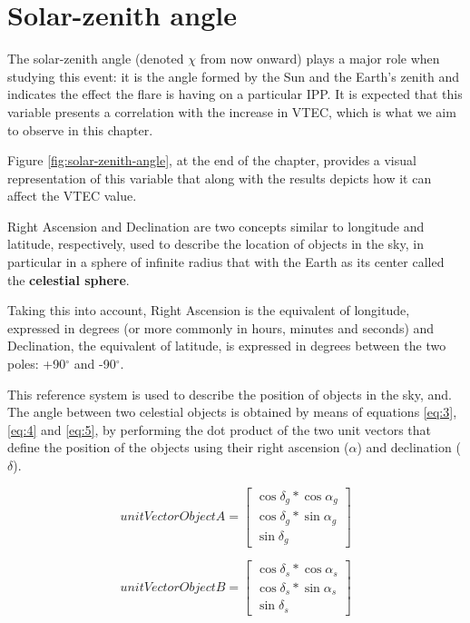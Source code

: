 \section{Solar-zenith angle}

The solar-zenith angle (denoted $\chi$ from now onward) plays a major role when studying this event: it is the angle formed by the Sun and the Earth's zenith and indicates the effect the flare is having on a particular IPP. It is expected that this variable presents a correlation with the increase in VTEC, which is what we aim to observe in this chapter.

Figure \ref{fig:solar-zenith-angle}, at the end of the chapter, provides a visual representation of this variable that along with the results depicts how it can affect the VTEC value. 

Right Ascension and Declination are two concepts similar to longitude and latitude, respectively, used to describe the location of objects in the sky, in particular in a sphere of infinite radius that with the Earth as its center called the \textbf{celestial sphere}.

Taking this into account, Right Ascension is the equivalent of longitude, expressed in degrees (or more commonly in hours, minutes and seconds) and Declination, the equivalent of latitude, is expressed in degrees between the two poles: +90$^{\circ}$ and -90$^{\circ}$. \cite{nasareferencesystem}

This reference system is used to describe the position of objects in the sky, and. The angle between two celestial objects is obtained by means of equations \ref{eq:3}, \ref{eq:4} and \ref{eq:5}, by performing the dot product of the two unit vectors that define the position of the objects using their right ascension ($\alpha$) and declination ($\delta$).

\begin{equation} \label{eq:3}
unitVectorObjectA =	
\begin{bmatrix}
\cos\delta_{g} * \cos\alpha_{g} \\ 
\cos\delta_{g} * \sin\alpha_{g} \\
\sin\delta_{g}
\end{bmatrix}
\end{equation}

\begin{equation} \label{eq:4}
unitVectorObjectB =	
\begin{bmatrix}
\cos\delta_{s} * \cos\alpha_{s} \\ 
\cos\delta_{s} * \sin\alpha_{s} \\
\sin\delta_{s}
\end{bmatrix}
\end{equation}

